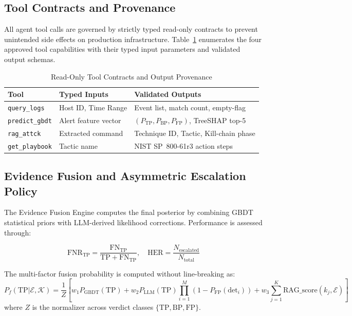 \subsection{Tool Contracts and Provenance}

All agent tool calls are governed by strictly typed read-only contracts to prevent
unintended side effects on production infrastructure. Table~\ref{tab:contracts}
enumerates the four approved tool capabilities with their typed input parameters
and validated output schemas.

\begin{table}[h]
\caption{Read-Only Tool Contracts and Output Provenance}
\label{tab:contracts}
\centering
\begin{tabular}{p{1.8cm}p{2.6cm}p{3.5cm}}
\toprule
\textbf{Tool} & \textbf{Typed Inputs} & \textbf{Validated Outputs} \\
\midrule
\texttt{query\_logs}    & Host ID, Time Range  & Event list, match count, empty-flag \\
\texttt{predict\_gbdt}  & Alert feature vector & $(P_{\text{TP}}, P_{\text{BP}}, P_{\text{FP}})$, TreeSHAP top-5 \\
\texttt{rag\_attck}     & Extracted command    & Technique ID, Tactic, Kill-chain phase \\
\texttt{get\_playbook}  & Tactic name          & NIST SP~800-61r3 action steps \\
\bottomrule
\end{tabular}
\end{table}

\subsection{Evidence Fusion and Asymmetric Escalation Policy}

The Evidence Fusion Engine computes the final posterior by combining GBDT statistical
priors with LLM-derived likelihood corrections. Performance is assessed through:

\begin{equation}
\text{FNR}_{\text{TP}} = \frac{\text{FN}_{\text{TP}}}{\text{TP} + \text{FN}_{\text{TP}}}, \quad \text{HER} = \frac{N_{\text{escalated}}}{N_{\text{total}}}
\end{equation}

The multi-factor fusion probability is computed without line-breaking as:
\begin{equation}
P_{f}(\text{TP}|\mathcal{E},\mathcal{K}) = \frac{1}{Z}[w_1 P_{\text{GBDT}}(\text{TP}) + w_2 P_{\text{LLM}}(\text{TP}) \prod_{i=1}^{M} (1 - P_{\text{FP}}(\text{det}_i)) + w_3 \sum_{j=1}^{K} \text{RAG\_score}(k_j, \mathcal{E})]
\end{equation}
where $Z$ is the normalizer across verdict classes $\{\text{TP}, \text{BP}, \text{FP}\}$.
